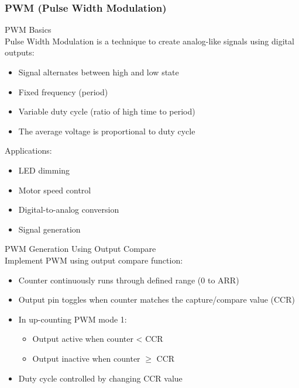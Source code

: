 \subsubsection{PWM (Pulse Width Modulation)}




\begin{definition}{PWM Basics}\\
Pulse Width Modulation is a technique to create analog-like signals using digital outputs:
\begin{itemize}
    \item Signal alternates between high and low state
    \item Fixed frequency (period)
    \item Variable duty cycle (ratio of high time to period)
    \item The average voltage is proportional to duty cycle
\end{itemize}
Applications:
\begin{itemize}
    \item LED dimming
    \item Motor speed control
    \item Digital-to-analog conversion
    \item Signal generation
\end{itemize}
\end{definition}


\begin{concept}{PWM Generation Using Output Compare}\\
Implement PWM using output compare function:
\begin{itemize}
    \item Counter continuously runs through defined range (0 to ARR)
    \item Output pin toggles when counter matches the capture/compare value (CCR)
    \item In up-counting PWM mode 1:
    \begin{itemize}
        \item Output active when counter < CCR
        \item Output inactive when counter $\geq$ CCR
    \end{itemize}
    \item Duty cycle controlled by changing CCR value
\end{itemize}
\end{concept}

